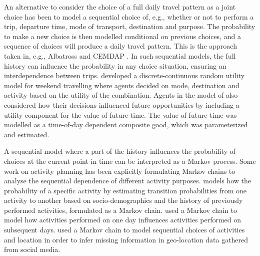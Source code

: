 An alternative to consider the choice of a full daily travel pattern as a joint choice has been to model a sequential choice of, e.g., whether or not to perform a trip, departure time, mode of transport, destination and purpose. The probability to make a new choice is then modelled conditional on previous choices, and a sequence of choices will produce a daily travel pattern. This is the approach taken in, e.g., Albatross \citep{timmermans2001modeling} and CEMDAP \citep{bhat2004comprehensive}. In such sequential models, the full history can influence the probability in any choice situation, ensuring an interdependence between trips. \citet{Habib11RUM} developed a discrete-continuous random utility model for weekend travelling where agents decided on mode, destination and activity based on the utility of the combination. Agents in the model of \citet{Habib11RUM} also considered how their decisions influenced future opportunities by including a utility component for the value of future time. The value of future time was modelled as a time-of-day dependent composite good, which was parameterized and estimated. 

A sequential model where a part of the history influences the probability of choices at the current point in time can be interpreted as a Markov process. Some work on activity planning has been explicitly formulating Markov chains to analyse the sequential dependence of different activity purposes. \citet{AllahviranlooMDP13} models how the probability of a specific activity by estimating transition probabilities from one activity to another based on socio-demographics and the history of previously performed activities, formulated as a Markov chain. \citet{susilo2014repetitions} used a Markov chain to model how activities performed on one day influences activities performed on subsequent days. \citet{hasan18} used a Markov chain to model sequential choices of activities and location in order to infer missing information in geo-location data gathered from social media.  

